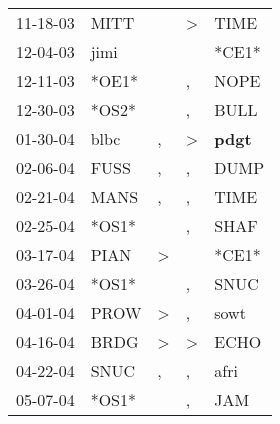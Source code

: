 \begin{supertabular}{p{0.07\textwidth}p{0.06\textwidth}p{0.02\textwidth}p{0.02\textwidth}p{0.06\textwidth}}
          11-18-03\textsuperscript{} &           MITT\textsuperscript{} &                  &     \textgreater &           TIME\textsuperscript{} \\
          12-04-03\textsuperscript{} &           jimi\textsuperscript{} &                  &                  &                            *CE1* \\
          12-11-03\textsuperscript{} &                            *OE1* &                  &                , &           NOPE\textsuperscript{} \\
          12-30-03\textsuperscript{} &                            *OS2* &                  &                , &           BULL\textsuperscript{} \\
          01-30-04\textsuperscript{} &           blbc\textsuperscript{} &                , &     \textgreater &  \textbf{pdgt\textsuperscript{}} \\
          02-06-04\textsuperscript{} &           FUSS\textsuperscript{} &                , &                , &           DUMP\textsuperscript{} \\
          02-21-04\textsuperscript{} &           MANS\textsuperscript{} &                , &                , &           TIME\textsuperscript{} \\
          02-25-04\textsuperscript{} &                            *OS1* &                  &                , &           SHAF\textsuperscript{} \\
          03-17-04\textsuperscript{} &           PIAN\textsuperscript{} &     \textgreater &                  &                            *CE1* \\
          03-26-04\textsuperscript{} &                            *OS1* &                  &                , &           SNUC\textsuperscript{} \\
          04-01-04\textsuperscript{} &           PROW\textsuperscript{} &     \textgreater &                , &           sowt\textsuperscript{} \\
          04-16-04\textsuperscript{} &           BRDG\textsuperscript{} &     \textgreater &     \textgreater &           ECHO\textsuperscript{} \\
          04-22-04\textsuperscript{} &           SNUC\textsuperscript{} &                , &                , &           afri\textsuperscript{} \\
          05-07-04\textsuperscript{} &                            *OS1* &                  &                , &            JAM\textsuperscript{} \\

\end{supertabular}
